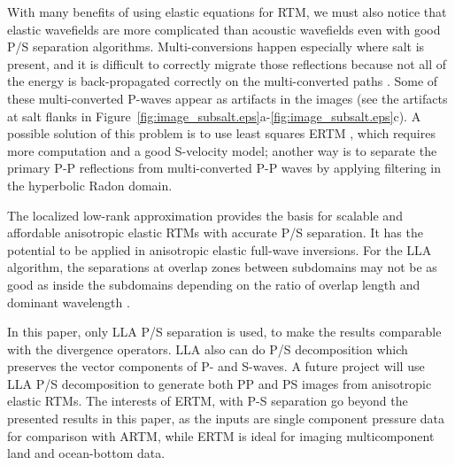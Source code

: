 \documentclass[manuscript,ulem,graphix,revised]{geophysics}
\begin{document}

\marginnote{[26]}With many benefits of using elastic equations for RTM, we must also notice that elastic wavefields are more complicated than acoustic wavefields even with good P/S separation algorithms. Multi-conversions happen especially where salt is present, and it is difficult to correctly migrate those reflections because not all of the energy is back-propagated correctly on the multi-converted paths \marginnote{[26,27]}. Some of these multi-converted P-waves appear as artifacts in the images (see the artifacts at salt flanks in Figure~\ref{fig:image_subsalt.eps}a-\ref{fig:image_subsalt.eps}c). 
\marginnote{[27,28]}A possible solution of this problem is to use least squares ERTM \citep{duan16}, which requires more computation and a good S-velocity model; 
another way is to separate the primary P-P reflections from multi-converted P-P waves by applying filtering in the hyperbolic Radon domain.

The localized low-rank approximation provides the basis for scalable and affordable anisotropic elastic RTMs with accurate P/S separation. It has the potential to be applied in anisotropic elastic full-wave inversions. For the LLA algorithm, the separations at overlap zones between subdomains may not be as good as inside the subdomains depending on the ratio of overlap length and dominant wavelength \citep{wenlong17}. 

In this paper, only LLA P/S separation is used, to make the results comparable with the divergence operators. LLA also can do P/S decomposition which preserves the vector components of P- and S-waves. A future project will use LLA P/S decomposition to generate both PP and PS images from anisotropic elastic RTMs. The interests of ERTM, with P-S separation go beyond the presented results in this paper, as the inputs are single component pressure data for comparison with ARTM, while ERTM is ideal for imaging multicomponent land and ocean-bottom data.\marginnote{[14]}
\end{document}
